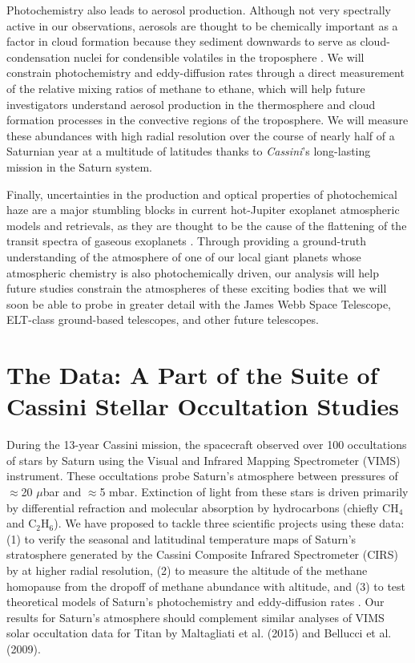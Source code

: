 \documentclass[twocolumn, twocolappendix, numberedappendix, linenumbers]{aastex631}
\newcommand{\Cas}{{\it Cassini}}
\begin{document}
Photochemistry also leads to aerosol production. Although not very spectrally
active in our observations, aerosols are thought to be chemically important as
a factor in cloud formation because they sediment downwards to serve as
cloud-condensation nuclei for condensible volatiles in the troposphere
\citep{Fletcher2018}. We will constrain photochemistry and eddy-diffusion rates
through a direct measurement of the relative mixing ratios of methane to
ethane, which will help future investigators understand aerosol production in
the thermosphere and cloud formation processes in the convective regions of the
troposphere. We will measure these abundances with high radial resolution over
the course of nearly half of a Saturnian year at a multitude of latitudes
thanks to \Cas's long-lasting mission in the Saturn system.

Finally, uncertainties in the production and optical properties of
photochemical haze are a major stumbling blocks in current hot-Jupiter
exoplanet atmospheric models and retrievals, as they are thought to be the
cause of the flattening of the transit spectra of gaseous exoplanets
\citep{Fraine2013}.  Through providing a ground-truth
understanding of the atmosphere of one of our local giant planets whose
atmospheric chemistry is also photochemically driven, our analysis will help
future studies constrain the atmospheres of these exciting bodies that we will
soon be able to probe in greater detail with the James Webb Space Telescope,
ELT-class ground-based telescopes, and other future telescopes.


\section{The Data: A Part of the Suite of Cassini Stellar Occultation Studies} \label{sec:intro-data}

During the 13-year Cassini mission, the spacecraft observed over 100
occultations of stars by Saturn using the Visual and Infrared Mapping
Spectrometer (VIMS) instrument. These occultations probe Saturn’s atmosphere
between pressures of $\approx$20 $\mu$bar and $\approx$5 mbar. Extinction of light from these stars
is driven primarily by differential refraction and molecular absorption by
hydrocarbons (chiefly CH$_4$ and C$_2$H$_6$). We have proposed to tackle three
scientific projects using these data: (1) to verify the seasonal and
latitudinal temperature maps of Saturn’s stratosphere generated by the Cassini
Composite Infrared Spectrometer (CIRS) by \citealp{Fletcher2007} at higher
radial resolution, (2) to measure the altitude of the methane homopause from
the dropoff of methane abundance with altitude, and (3) to test theoretical
models of Saturn's photochemistry and eddy-diffusion rates \citep{Moses2005}. Our
results for Saturn's atmosphere should complement similar analyses of VIMS
solar occultation data for Titan by Maltagliati et al.  (2015) and Bellucci et
al. (2009).
\end{document}
